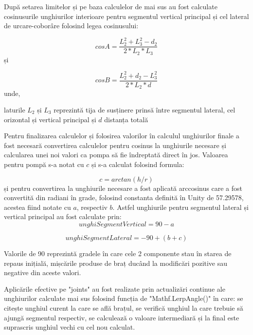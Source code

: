 După setarea limitelor și pe baza calculelor de mai sus au fost calculate cosinusurile unghiurilor interioare pentru segmentul vertical principal și cel lateral de urcare-coborâre folosind legea cosinusului:

\begin{equation}
	cosA = \frac{L_2^2+L_3^2 - d_2}{2*L_2*L_3}
\end{equation}
și


\begin{equation}
		cosB = \frac{L_2^2+ d_2 -L_3^2}{2*L_2*d}
\end{equation}
unde, 

laturile $L_2$ și $L_3$ reprezintă tija de susținere prinsă între segmentul lateral, cel orizontal și vertical principal și $d$ distanța totală
  
  
  
 Pentru finalizarea calculelor și folosirea valorilor în calculul unghiurilor finale  a fost necesară convertirea calculelor pentru cosinus la  unghiurile necesare și calcularea unei noi valori ca pompa să fie îndreptată direct în jos. Valoarea pentru pompă s-a notat cu $c$ și s-a calculat  folosind formula:
 
 \begin{equation}
 	c =  arctan(h/r)
 \end{equation}
 și pentru convertirea la unghiurile necesare a fost aplicată arccosinus care a fost convertită din radiani în grade, folosind constanta definită în Unity de 57.29578, acestea fiind notate cu $a$, respectiv $b$.
 Astfel unghiurile pentru segmentul lateral și vertical principal au fost calculate prin:
 \begin{equation}
 	unghiSegmentVertical = 90 - a 
 \end{equation}
 
 
  \begin{equation}
 	unghiSegmentLateral = -90 + (b+c)
 \end{equation}
 
Valorile de 90 reprezintă gradele în care cele 2 componente stau în starea de repaus inițială, mișcările produse de braț ducând la modificări pozitive sau negative din aceste valori. 



Aplicările efective pe "joints" au fost realizate prin actualizări continue ale unghiurilor calculate mai sus folosind funcția de "Mathf.LerpAngle()" în care: se citește unghiul curent la care se află brațul, se verifică unghiul la care trebuie să ajungă segmentul respectiv, se calculează o valoare intermediară și la final este suprascris unghiul vechi cu cel nou calculat.


